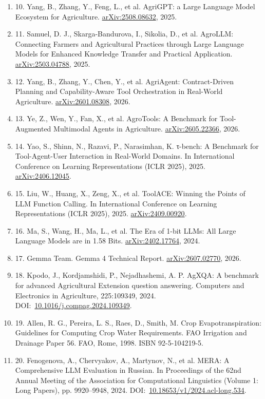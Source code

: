\documentclass[10pt,a4paper]{article}
\begin{document}
\begin{enumerate}[label={},leftmargin=0.9cm,itemindent=-0.9cm,itemsep=0pt,parsep=0pt,topsep=2pt]
\item 10. Yang, B., Zhang, Y., Feng, L., et al. AgriGPT: a Large Language Model Ecosystem for Agriculture. \href{https://arxiv.org/abs/2508.08632}{arXiv:2508.08632}, 2025.
\item 11. Samuel, D. J., Skarga-Bandurova, I., Sikolia, D., et al. AgroLLM: Connecting Farmers and Agricultural Practices through Large Language Models for Enhanced Knowledge Transfer and Practical Application. \href{https://arxiv.org/abs/2503.04788}{arXiv:2503.04788}, 2025.
\item 12. Yang, B., Zhang, Y., Chen, Y., et al. AgriAgent: Contract-Driven Planning and Capability-Aware Tool Orchestration in Real-World Agriculture. \href{https://arxiv.org/abs/2601.08308}{arXiv:2601.08308}, 2026.
\item 13. Ye, Z., Wen, Y., Fan, X., et al. AgroTools: A Benchmark for Tool-Augmented Multimodal Agents in Agriculture. \href{https://arxiv.org/abs/2605.22366}{arXiv:2605.22366}, 2026.
\item 14. Yao, S., Shinn, N., Razavi, P., Narasimhan, K. τ-bench: A Benchmark for Tool-Agent-User Interaction in Real-World Domains. In International Conference on Learning Representations (ICLR 2025), 2025. \href{https://arxiv.org/abs/2406.12045}{arXiv:2406.12045}.
\item 15. Liu, W., Huang, X., Zeng, X., et al. ToolACE: Winning the Points of LLM Function Calling. In International Conference on Learning Representations (ICLR 2025), 2025. \href{https://arxiv.org/abs/2409.00920}{arXiv:2409.00920}.
\item 16. Ma, S., Wang, H., Ma, L., et al. The Era of 1-bit LLMs: All Large Language Models are in 1.58 Bits. \href{https://arxiv.org/abs/2402.17764}{arXiv:2402.17764}, 2024.
\item 17. Gemma Team. Gemma 4 Technical Report. \href{https://arxiv.org/abs/2607.02770}{arXiv:2607.02770}, 2026.
\item 18. Kpodo, J., Kordjamshidi, P., Nejadhashemi, A. P. AgXQA: A benchmark for advanced Agricultural Extension question answering. Computers and Electronics in Agriculture, 225:109349, 2024. DOI:~\href{https://doi.org/10.1016/j.compag.2024.109349}{10.1016/j.compag.2024.109349}.
\item 19. Allen, R. G., Pereira, L. S., Raes, D., Smith, M. Crop Evapotranspiration: Guidelines for Computing Crop Water Requirements. FAO Irrigation and Drainage Paper 56. FAO, Rome, 1998. ISBN 92-5-104219-5.
\item 20. Fenogenova, A., Chervyakov, A., Martynov, N., et al. MERA: A Comprehensive LLM Evaluation in Russian. In Proceedings of the 62nd Annual Meeting of the Association for Computational Linguistics (Volume 1: Long Papers), pp. 9920–9948, 2024. DOI:~\href{https://doi.org/10.18653/v1/2024.acl-long.534}{10.18653/v1/2024.acl-long.534}.
\end{enumerate}\endgroup
\end{document}
